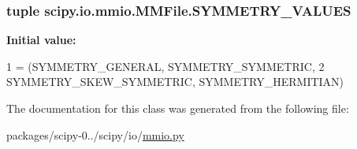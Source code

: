 \subsubsection[{S\+Y\+M\+M\+E\+T\+R\+Y\+\_\+\+V\+A\+L\+U\+E\+S}]{\setlength{\rightskip}{0pt plus 5cm}tuple scipy.\+io.\+mmio.\+M\+M\+File.\+S\+Y\+M\+M\+E\+T\+R\+Y\+\_\+\+V\+A\+L\+U\+E\+S\hspace{0.3cm}{\ttfamily [static]}}\label{classscipy_1_1io_1_1mmio_1_1MMFile_af10eb857e55b084461e9f77334db3703}
{\bfseries Initial value\+:}
\begin{DoxyCode}
1 = (SYMMETRY\_GENERAL, SYMMETRY\_SYMMETRIC,
2                         SYMMETRY\_SKEW\_SYMMETRIC, SYMMETRY\_HERMITIAN)
\end{DoxyCode}


The documentation for this class was generated from the following file\+:\begin{DoxyCompactItemize}
\item 
packages/scipy-\/0../scipy/io/\hyperlink{mmio_8py}{mmio.\+py}\end{DoxyCompactItemize}
